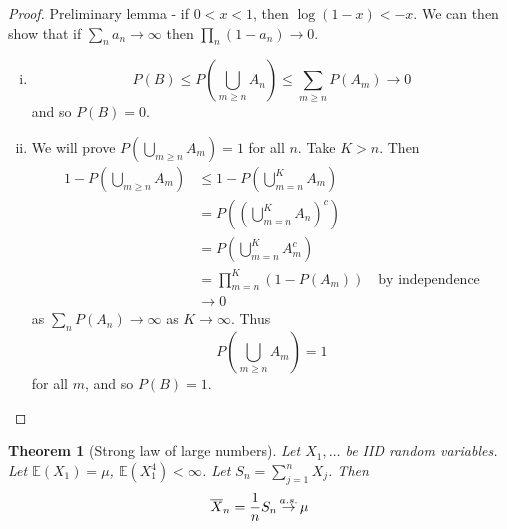 \documentclass[10pt, oneside, reqno]{amsart}
\theoremstyle{plain}%
\newtheorem{thm}{Theorem}[section]
\theoremstyle{definition}
\theoremstyle{remark}
\newcommand{\E}{\mathbb{E}}
\def\cas{\,{\buildrel a.s. \over \rightarrow}\,}
\begin{document}
\begin{proof}
    Preliminary lemma - if $0 < x < 1$, then $\log(1-x) < -x$.  We can then show that if $\sum_n a_n \rightarrow \infty$ then $\prod_n (1- a_n) \rightarrow 0$.  
    
    \begin{enumerate}[(i)]
        \item \[ P(B) \leq P(\bigcup_{m \geq n} A_n) \leq \sum_{m  \geq n} P(A_m) \rightarrow 0 \] and so $P(B) = 0$.
        \item We will prove $P(\bigcup_{m \geq n} A_m) = 1$ for all $n$. Take $K > n$.  Then \begin{align*}
            1 - P(\bigcup_{m \geq n} A_m) &\leq 1 - P(\bigcup_{m=n}^K A_m) \\
                                        &= P( (\bigcup_{m=n}^K A_n)^c) \\
                                        &= P( \bigcup_{m=n}^K A_m^c) \\
                                        &= \prod_{m=n}^K ( 1 - P(A_m)) \quad \text{by independence} \\
                                        &\rightarrow 0
        \end{align*}  as $\sum_{n} P(A_n) \rightarrow \infty$ as $K \rightarrow \infty$.  Thus \[
            P(\bigcup_{m \geq n} A_m) = 1
        \] for all $m$, and so $P(B) = 1$.  
    \end{enumerate}
\end{proof}

\begin{thm}[Strong law of large numbers]  Let $X_1, \dots$ be IID random variables.  Let $\E(X_1) = \mu$, $\E(X_1^4) < \infty$.  Let $S_n = \sum_{j=1}^n X_j$.  Then \[
    \overline X_n = \frac{1}{n} S_n \cas \mu 
\]
\end{thm}
\end{document}

